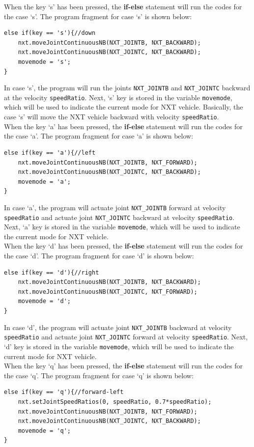 \documentclass[11pt]{article}
\begin{document}
When the key `s' has been pressed, the {\bf if-else} statement will run 
the codes for the case `s'. The program fragment for case `s' is shown below:
\begin{lstlisting}
else if(key == 's'){//down
    nxt.moveJointContinuousNB(NXT_JOINTB, NXT_BACKWARD);
    nxt.moveJointContinuousNB(NXT_JOINTC, NXT_BACKWARD);
    movemode = 's';
}
\end{lstlisting}
In case `s', the program will run the joints {\tt NXT\_JOINTB} and 
{\tt NXT\_JOINTC} backward at the velocity {\tt speedRatio}. Next, `s' key is 
stored in the variable {\tt movemode}, which will be used to indicate the 
current mode for NXT vehicle. Basically, the case `s' will move the NXT vehicle 
backward with velocity {\tt speedRatio}.\\ 
When the key `a' has been pressed, the {\bf if-else} statement will run 
the codes for the case `a'. The program fragment for case `a' is shown below:
\begin{lstlisting}
else if(key == 'a'){//left
    nxt.moveJointContinuousNB(NXT_JOINTB, NXT_FORWARD);
    nxt.moveJointContinuousNB(NXT_JOINTC, NXT_BACKWARD);
    movemode = 'a';
}
\end{lstlisting}
In case `a', the program will actuate joint {\tt NXT\_JOINTB} forward at velocity 
{\tt speedRatio} and actuate joint {\tt NXT\_JOINTC} backward at velocity 
{\tt speedRatio}. Next, `a' key is stored in the variable {\tt movemode}, which 
will be used to indicate the current mode for NXT vehicle.\\ 
When the key `d' has been pressed, the {\bf if-else} statement will run 
the codes for the case `d'. The program fragment for case `d' is shown below:
\begin{lstlisting}
else if(key == 'd'){//right
    nxt.moveJointContinuousNB(NXT_JOINTB, NXT_BACKWARD);
    nxt.moveJointContinuousNB(NXT_JOINTC, NXT_FORWARD);
    movemode = 'd';
}
\end{lstlisting}
In case `d', the program will actuate joint {\tt NXT\_JOINTB} backward at 
velocity {\tt speedRatio} and actuate joint {\tt NXT\_JOINTC} forward at velocity 
{\tt speedRatio}. Next, `d' key is stored in the variable {\tt movemode}, which 
will be used to indicate the current mode for NXT vehicle.\\ 
When the key `q' has been pressed, the {\bf if-else} statement will run 
the codes for the case `q'. The program fragment for case `q' is shown below:
\begin{lstlisting}
else if(key == 'q'){//forward-left
    nxt.setJointSpeedRatios(0, speedRatio, 0.7*speedRatio);
    nxt.moveJointContinuousNB(NXT_JOINTB, NXT_FORWARD);
    nxt.moveJointContinuousNB(NXT_JOINTC, NXT_BACKWARD);
    movemode = 'q';
}
\end{lstlisting}
\end{document}

